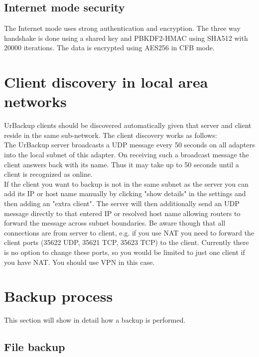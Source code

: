 \documentclass[a4paper,10pt]{article} \usepackage[breaklinks=true]{hyperref}
\begin{document}
\subsection{Internet mode security}

The Internet mode uses strong authentication and encryption. The three way
handshake is done using a shared key and PBKDF2-HMAC using SHA512 with 20000
iterations. The data is encrypted using AES256 in CFB mode.


\section{Client discovery in local area networks}
\label{client_discovery}

UrBackup clients should be discovered automatically given that server and client reside in the same sub-network. The client discovery works as follows:\\
The UrBackup server broadcasts a UDP message every 50 seconds on all adapters into the local subnet of this adapter. On receiving such a broadcast message the client answers back with its name. Thus it may take up to 50 seconds until a client is recognized as online.\\
If the client you want to backup is not in the same subnet as the server you can add its IP or host name manually by clicking "show details" in the settings and then adding an "extra client". The server will then additionally send an UDP message directly to that entered IP or resolved host name allowing routers to forward the message across subnet boundaries. Be aware though that all connections are from server to client, e.g. if you use NAT you need to forward the client ports (35622 UDP, 35621 TCP, 35623 TCP) to the client. Currently there is no option to change these ports, so you would be limited to just one client if you have NAT. You should use VPN in this case.

\section{Backup process}
\label{sec_backup_process}

This section will show in detail how a backup is performed.

\subsection{File backup}
\end{document}
